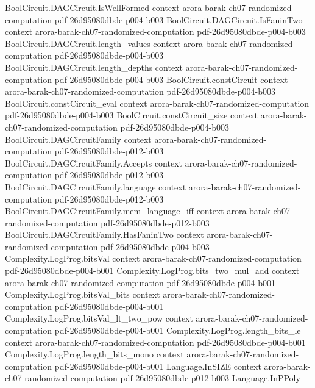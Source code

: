 \begin{theorem}
\proofstep
  {BoolCircuit.DAGCircuit.IsWellFormed}
  {context}
  {arora-barak-ch07-randomized-computation}
  {pdf-26d95080dbde-p004-b003}
\proofstep
  {BoolCircuit.DAGCircuit.IsFaninTwo}
  {context}
  {arora-barak-ch07-randomized-computation}
  {pdf-26d95080dbde-p004-b003}
\proofstep
  {BoolCircuit.DAGCircuit.length_values}
  {context}
  {arora-barak-ch07-randomized-computation}
  {pdf-26d95080dbde-p004-b003}
\proofstep
  {BoolCircuit.DAGCircuit.length_depths}
  {context}
  {arora-barak-ch07-randomized-computation}
  {pdf-26d95080dbde-p004-b003}
\proofstep
  {BoolCircuit.constCircuit}
  {context}
  {arora-barak-ch07-randomized-computation}
  {pdf-26d95080dbde-p004-b003}
\proofstep
  {BoolCircuit.constCircuit_eval}
  {context}
  {arora-barak-ch07-randomized-computation}
  {pdf-26d95080dbde-p004-b003}
\proofstep
  {BoolCircuit.constCircuit_size}
  {context}
  {arora-barak-ch07-randomized-computation}
  {pdf-26d95080dbde-p004-b003}
\proofstep
  {BoolCircuit.DAGCircuitFamily}
  {context}
  {arora-barak-ch07-randomized-computation}
  {pdf-26d95080dbde-p012-b003}
\proofstep
  {BoolCircuit.DAGCircuitFamily.Accepts}
  {context}
  {arora-barak-ch07-randomized-computation}
  {pdf-26d95080dbde-p012-b003}
\proofstep
  {BoolCircuit.DAGCircuitFamily.language}
  {context}
  {arora-barak-ch07-randomized-computation}
  {pdf-26d95080dbde-p012-b003}
\proofstep
  {BoolCircuit.DAGCircuitFamily.mem_language_iff}
  {context}
  {arora-barak-ch07-randomized-computation}
  {pdf-26d95080dbde-p012-b003}
\proofstep
  {BoolCircuit.DAGCircuitFamily.HasFaninTwo}
  {context}
  {arora-barak-ch07-randomized-computation}
  {pdf-26d95080dbde-p004-b003}
\proofstep
  {Complexity.LogProg.bitsVal}
  {context}
  {arora-barak-ch07-randomized-computation}
  {pdf-26d95080dbde-p004-b001}
\proofstep
  {Complexity.LogProg.bits_two_mul_add}
  {context}
  {arora-barak-ch07-randomized-computation}
  {pdf-26d95080dbde-p004-b001}
\proofstep
  {Complexity.LogProg.bitsVal_bits}
  {context}
  {arora-barak-ch07-randomized-computation}
  {pdf-26d95080dbde-p004-b001}
\proofstep
  {Complexity.LogProg.bitsVal_lt_two_pow}
  {context}
  {arora-barak-ch07-randomized-computation}
  {pdf-26d95080dbde-p004-b001}
\proofstep
  {Complexity.LogProg.length_bits_le}
  {context}
  {arora-barak-ch07-randomized-computation}
  {pdf-26d95080dbde-p004-b001}
\proofstep
  {Complexity.LogProg.length_bits_mono}
  {context}
  {arora-barak-ch07-randomized-computation}
  {pdf-26d95080dbde-p004-b001}
\proofstep
  {Language.InSIZE}
  {context}
  {arora-barak-ch07-randomized-computation}
  {pdf-26d95080dbde-p012-b003}
\proofstep
  {Language.InPPoly}

\end{theorem}
